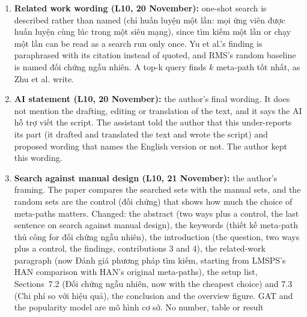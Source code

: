 \documentclass[11pt,a4paper]{article}
\DeclareRobustCommand{\code}[1]{\texttt{\detokenize{#1}}}
\newcommand{\vi}[1]{\foreignlanguage{vietnamese}{#1}}
\begin{document}
\begin{enumerate}[label=N\arabic*]
        Section~7.5. The conclusion gained the cheapest choice, the lesson that a search should be
        judged by the recommender it serves, and a \vi{Hạn chế} paragraph (the small schema, the
        single random split, the untuned configuration, the smaller search, the AI-assisted manual
        sets). The sampled-metric item is covered in Section~6. The training details and the
        leaf-only categories are Appendix~H. The cross-references in Sections 1, 2 and 4 follow.
        The main text ends 0.34 page earlier (8.74 pages in). \code{paper_v2} keeps its Sections 8
        and 9.
  \item \textbf{Related work wording (L10, 20 November):} one-shot search is described rather than
        named (\vi{chỉ huấn luyện một lần: mọi ứng viên được huấn luyện cùng lúc trong một siêu
        mạng}), since \vi{tìm kiếm một lần} or \vi{chạy một lần} can be read as a search run only
        once. Yu et al.'s finding is
        paraphrased with its citation instead of quoted, and RMS's random baseline is named
        \vi{đối chứng ngẫu nhiên}. A top-k query finds \vi{$k$ meta-path tốt nhất}, as Zhu et al.
        write.
  \item \textbf{AI statement (L10, 20 November):} the author's final wording. It does not mention
        the drafting, editing or translation of the text, and it says the AI \vi{hỗ trợ viết} the
        script. The assistant told the author that this under-reports its part (it drafted and
        translated the text and wrote the script) and proposed wording that names the English
        version or not. The author kept this wording.
  \item \textbf{Search against manual design (L10, 21 November):} the author's framing. The paper
        compares the searched sets with the manual sets, and the random sets are the control
        (\vi{đối chứng}) that shows how much the choice of meta-paths matters. Changed: the abstract
        (two ways plus a control, the last sentence on search against manual design), the keywords
        (\vi{thiết kế meta-path thủ công} for \vi{đối chứng ngẫu nhiên}), the introduction (the
        question, two ways plus a control, the findings, contributions 3 and 4), the related-work
        paragraph (now \vi{Đánh giá phương pháp tìm kiếm}, starting from LMSPS's HAN comparison with
        HAN's original meta-paths), the setup list, Sections~7.2 (\vi{Đối chứng ngẫu nhiên}, now with
        the cheapest choice) and 7.3 (\vi{Chi phí so với hiệu quả}), the conclusion and the overview
        figure. GAT and the popularity model are \vi{mô hình cơ sở}. No number, table or result

\end{enumerate}
\end{document}
